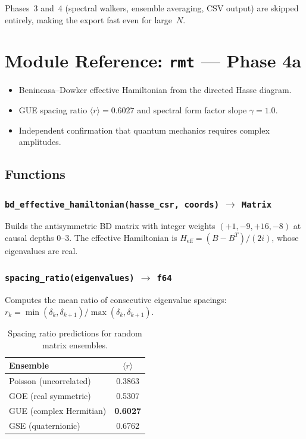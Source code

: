 \documentclass[11pt, a4paper, openany]{book}
\newcommand{\code}[1]{\texttt{#1}}
\newcommand{\func}[1]{\texttt{\color{structure}#1}}
\newcommand{\modname}[1]{\texttt{\bfseries\color{main}#1}}
\newenvironment{introduction}[1][Chapter Overview]{%
  \begin{tcolorbox}[
    enhanced,colback=structure!5,colframe=structure,
    colbacktitle=structure,coltitle=white,
    fonttitle=\small\bfseries,title={#1},
    arc=2pt,boxrule=0.7pt,
    left=8pt,right=8pt,top=6pt,bottom=6pt,
    before skip=12pt,after skip=12pt
  ]\itshape\begin{itemize}[leftmargin=*,itemsep=2pt,parsep=0pt]
}{%
  \end{itemize}\end{tcolorbox}
}
\begin{document}
Phases~3 and~4 (spectral walkers, ensemble averaging, CSV output) are skipped entirely,
making the export fast even for large~$N$.


\chapter{Module Reference: \modname{rmt} --- Phase 4a}

\begin{introduction}[Random Matrix Theory (GUE)]
  \item Benincasa--Dowker effective Hamiltonian from the directed Hasse diagram.
  \item GUE spacing ratio $\langle r \rangle = 0.6027$ and spectral form factor slope $\gamma = 1.0$.
  \item Independent confirmation that quantum mechanics requires complex amplitudes.
\end{introduction}

\section{Functions}

\subsection{\func{bd\_effective\_hamiltonian(hasse\_csr, coords)} $\to$ \code{Matrix}}

Builds the antisymmetric BD matrix with integer weights $(+1, -9, +16, -8)$ at
causal depths $0$--$3$.  The effective Hamiltonian is
$H_\text{eff} = (B - B^T) / (2i)$, whose eigenvalues are real.

\subsection{\func{spacing\_ratio(eigenvalues)} $\to$ \code{f64}}

Computes the mean ratio of consecutive eigenvalue spacings:
$r_k = \min(\delta_k, \delta_{k+1}) / \max(\delta_k, \delta_{k+1})$.

\begin{table}[H]
\centering
\begin{tabular}{@{} l c @{}}
\toprule
\textbf{Ensemble} & $\langle r \rangle$ \\
\midrule
Poisson (uncorrelated) & 0.3863 \\
GOE (real symmetric)   & 0.5307 \\
GUE (complex Hermitian) & \textbf{0.6027} \\
GSE (quaternionic)     & 0.6762 \\
\bottomrule
\end{tabular}
\caption{Spacing ratio predictions for random matrix ensembles.}
\end{table}
\end{document}
